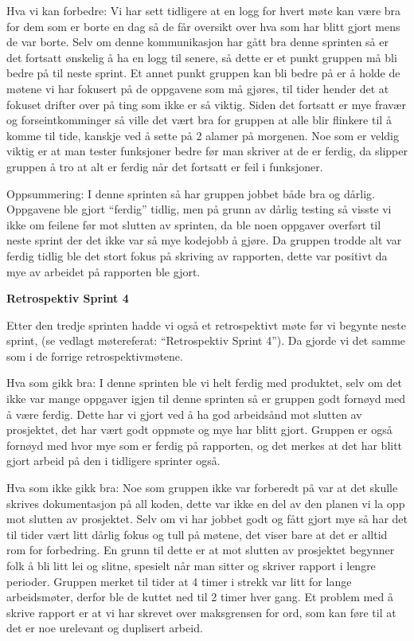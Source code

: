 \documentclass[12pt,a4paper,norsk]{article}
\begin{document}
Hva vi kan forbedre:
Vi har sett tidligere at en logg for hvert møte kan være bra for dem som er borte en dag så de får oversikt over hva som har blitt gjort mens de var borte. Selv om denne kommunikasjon har gått bra denne sprinten så er det fortsatt ønskelig å ha en logg til senere, så dette er et punkt gruppen må bli bedre på til neste sprint. 
Et annet punkt gruppen kan bli bedre på er å holde de møtene vi har fokusert på de oppgavene som må gjøres, til tider hender det at fokuset drifter over på ting som ikke er så viktig. Siden det fortsatt er mye fravær og forseintkomminger så ville det vært bra for gruppen at alle blir flinkere til å komme til tide, kanskje ved å sette på 2 alamer på morgenen.   
Noe som er veldig viktig er at man tester funksjoner bedre før man skriver at de er ferdig, da slipper gruppen å tro at alt er ferdig når det fortsatt er feil i funksjoner. 

Oppsummering:
I denne sprinten så har gruppen jobbet både bra og dårlig. Oppgavene ble gjort “ferdig” tidlig, men på grunn av dårlig testing så visste vi ikke om feilene før mot slutten av sprinten, da ble noen oppgaver overført til neste sprint der det ikke var så mye kodejobb å gjøre. Da gruppen trodde alt var ferdig tidlig ble det stort fokus på skriving av rapporten, dette var positivt da mye av arbeidet på rapporten ble gjort.

\bigskip \noindent \textbf{Retrospektiv Sprint 4}
\par Etter den tredje sprinten hadde vi også et retrospektivt møte før vi begynte neste sprint, (se vedlagt møtereferat: “Retrospektiv Sprint 4”). Da gjorde vi det samme som i de forrige retrospektivmøtene. 

Hva som gikk bra:
I denne sprinten ble vi helt ferdig med produktet, selv om det ikke var mange oppgaver igjen til denne sprinten så er gruppen godt fornøyd med å være ferdig. Dette har vi gjort ved å ha god arbeidsånd mot slutten av prosjektet, det har vært godt oppmøte og mye har blitt gjort. 
Gruppen er også fornøyd med hvor mye som er ferdig på rapporten, og det merkes at det har blitt gjort arbeid på den i tidligere sprinter også. 

Hva som ikke gikk bra:
Noe som gruppen ikke var forberedt på var at det skulle skrives dokumentasjon på all koden, dette var ikke en del av den planen vi la opp mot slutten av prosjektet. 
Selv om vi har jobbet godt og fått gjort mye så har det til tider vært litt dårlig fokus og tull på møtene, det viser bare at det er alltid rom for forbedring. En grunn til dette er at mot slutten av prosjektet begynner folk å bli litt lei og slitne, spesielt når man sitter og skriver rapport i lengre perioder. Gruppen merket til tider at 4 timer i strekk var litt for lange arbeidsmøter, derfor ble de kuttet ned til 2 timer hver gang.
Et problem med å skrive rapport er at vi har skrevet over maksgrensen for ord, som kan føre til at det er noe urelevant og duplisert arbeid. 
\end{document}
